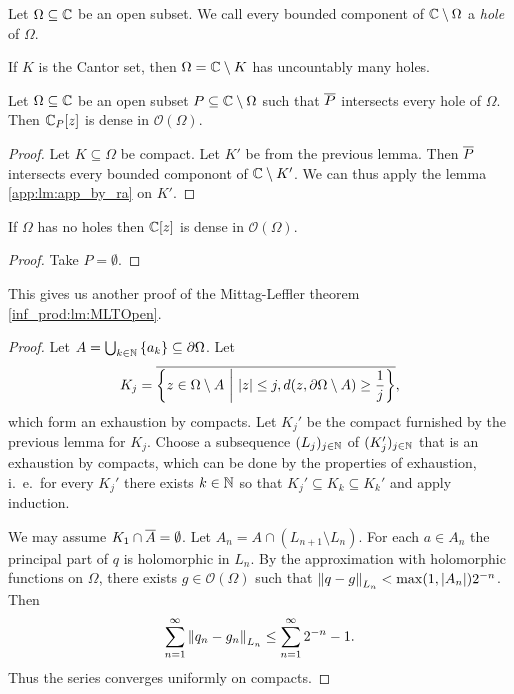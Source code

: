 \begin{definicija}
    Let $\Omega \subseteq \mathbb{C}$ be an open subset. We call every bounded component of $\mathbb{C} \setminus \Omega$ a \emph{hole} of $\Omega$.
\end{definicija}

\begin{opomba}
    If $K$ is the Cantor set, then $\Omega = \mathbb{C} \setminus K$ has uncountably many holes.
\end{opomba}

\begin{izrek}
    Let $\Omega \subseteq \mathbb{C}$ be an open subset $P \subseteq \mathbb{C} \setminus \Omega$ such that $\overline{P}$ intersects every hole of $\Omega$. Then $\mathbb{C}_P[z]$ is dense in $\mathcal{O}(\Omega)$.
\end{izrek}
\begin{proof}
    Let $K \subseteq \Omega$ be compact. Let $K'$ be from the previous lemma. Then $\overline{P}$ intersects every bounded componont of $\mathbb{C} \setminus K'$. We can thus apply the lemma \ref{app:lm:app_by_ra} on $K'$. 
\end{proof}
\begin{posledica}
    If $\Omega$ has no holes then $\mathbb{C}[z]$ is dense in $\mathcal{O}(\Omega)$.
\end{posledica}
\begin{proof}
    Take $P = \emptyset$.
\end{proof}

\begin{opomba}
    This gives us another proof of the Mittag-Leffler theorem \ref{inf_prod:lm:MLTOpen}.
\end{opomba}
\begin{proof}
    Let $A = \bigcup_{k \in \mathbb{N}} \left\{a_k\right\} \subseteq \partial{\Omega}$. Let 
    \[
        K_j = \overline{\left\{z \in \Omega \setminus A~\middle\vert~\left\lvert z\right\rvert \leq j, d(z, \partial{\Omega  \setminus A}) \geq \frac{1}{j}\right\}},
    \] which form an exhaustion by compacts. Let $K_j'$ be the compact furnished by the previous lemma for $K_j$. Choose a subsequence $(L_j)_{j \in \mathbb{N}}$ of $(K_j')_{j \in \mathbb{N}}$ that is an exhaustion by compacts, which can be done by the properties of exhaustion, i.\ e.\ for every $K_j'$ there exists $k \in \mathbb{N}$ so that $K_j' \subseteq K_k \subseteq K_k'$ and apply induction.

    We may assume $K_1 \cap \overline{A} = \emptyset$. Let $A_n = A \cap (L_{n + 1} \setminus L_n)$. For each $a \in A_n$ the principal part of $q$ is holomorphic in $L_n$. By the approximation with holomorphic functions on $\Omega$, there exists $g \in \mathcal{O}(\Omega)$ such that $\left\lVert q - g\right\rVert_{L_n} < \max(1, \left\lvert A_n\right\rvert) 2^{- n}$. Then
    \[
        \sum_{n = 1}^{\infty} \left\lVert q_n - g_n\right\rVert_{L_n} \leq \sum_{n = 1}^{\infty} 2^{ - n} - 1.
    \]
    Thus the series converges uniformly on compacts.
\end{proof}

